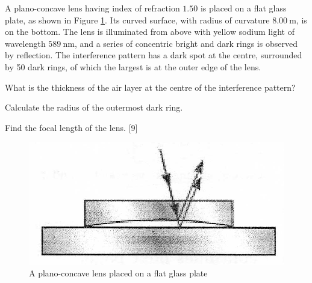 \begin{problem}
    A plano-concave lens having index of refraction $1.50$ is placed on a flat glass plate, as shown in Figure \ref{2010q8}. Its curved surface, with radius of curvature $\qty{8.00}{\m}$, is on the bottom. The lens is illuminated from above with yellow sodium light of wavelength $\qty{589}{\nm}$, and a series of concentric bright and dark rings is observed by reflection. The interference pattern has a dark spot at the centre, surrounded by 50 dark rings, of which the largest is at the outer edge of the lens.
    \begin{subproblem}
        What is the thickness of the air layer at the centre of the interference pattern?
    \end{subproblem}
    \begin{subproblem}
        Calculate the radius of the outermost dark ring.
    \end{subproblem}
    \begin{subproblem}
        Find the focal length of the lens.
    \hfill{[9]}\end{subproblem}
    \begin{figure}[h]
	    \centering
	    \includegraphics[width=0.5\linewidth]{spho_book_TYS_images/2010q8.png}
	    \caption{A plano-concave lens placed on a flat glass plate} \label{2010q8}
    \end{figure}
\end{problem}

